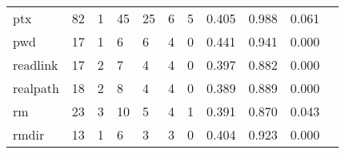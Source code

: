 \begin{longtable}{lp{1.20cm}p{1.20cm}p{1.20cm}p{1.20cm}p{1.20cm}p{1.20cm}p{1.20cm}p{1.20cm}p{1.20cm}p{1.20cm}}
ptx       &                                    82 &                                                  1 &                                                 45 &                                                 25 &                                                  6 &                                                  5 &                                         0.405 &                                              0.988 &                                              0.061 \\
pwd       &                                    17 &                                                  1 &                                                  6 &                                                  6 &                                                  4 &                                                  0 &                                         0.441 &                                              0.941 &                                              0.000 \\
readlink  &                                    17 &                                                  2 &                                                  7 &                                                  4 &                                                  4 &                                                  0 &                                         0.397 &                                              0.882 &                                              0.000 \\
realpath  &                                    18 &                                                  2 &                                                  8 &                                                  4 &                                                  4 &                                                  0 &                                         0.389 &                                              0.889 &                                              0.000 \\
rm        &                                    23 &                                                  3 &                                                 10 &                                                  5 &                                                  4 &                                                  1 &                                         0.391 &                                              0.870 &                                              0.043 \\
rmdir     &                                    13 &                                                  1 &                                                  6 &                                                  3 &                                                  3 &                                                  0 &                                         0.404 &                                              0.923 &                                              0.000 \\

\end{longtable}
